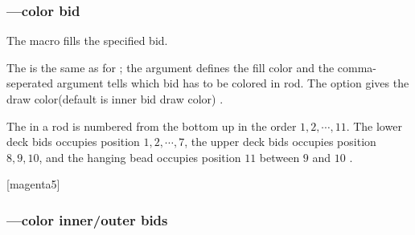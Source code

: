 \documentclass[full]{l3doc}
\begin{document}
\begin{documentation}
\begin{SideBySideExample}[frame=single,numbers=left,%
    xrightmargin=.48\linewidth,gobble=2]
  \centering
  \begin{suanpan}
  \end{suanpan}
\end{SideBySideExample}

\subsubsection{---color bid}

\begin{function}{\bid}
  \begin{syntax}
     
  \end{syntax}
\end{function}

  The  macro fills the specified bid.

  The  is the same as for ; the  argument
  defines the fill color and the comma-seperated  argument tells
  which bid has to be colored in  rod. The  option
  gives the draw color(default is inner bid draw color) .

  The  in a rod is numbered from the bottom up in the order
  $1, 2, \cdots, 11$. The lower deck bids occupies position
  $1, 2, \cdots, 7$, the upper deck bids occupies position $8, 9, 10$,
  and the hanging bead occupies position $11$ between $9$ and $10$ .

\begin{SideBySideExample}[frame=single,numbers=left,%
    xrightmargin=.48\linewidth,gobble=2]
  \centering
  \begin{suanpan}
    [magenta5]
  \end{suanpan}
\end{SideBySideExample}

\subsubsection{---color inner/outer bids}


\end{documentation}
\end{document}
